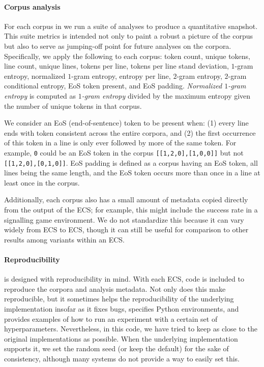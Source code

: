 \paragraph{Corpus analysis}
For each corpus in \theLib{} we run a suite of analyses to produce a quantitative snapshot.
This suite metrics is intended not only to paint a robust a picture of the corpus but also to serve as jumping-off point for future analyses on the corpora.
Specifically, we apply the following to each corpus:
  token count,
  unique tokens,
  line count,
  unique lines,
  tokens per line,
  tokens per line stand deviation,
  $1$-gram entropy,
  normalized $1$-gram entropy,
  entropy per line,
  $2$-gram entropy,
  $2$-gram conditional entropy,
  EoS token present,
  and EoS padding.
\emph{Normalized $1$-gram entropy} is computed as \emph{$1$-gram entropy} divided by the maximum entropy given the number of unique tokens in that corpus.

We consider an EoS (end-of-sentence) token to be present when:
  (1) every line ends with token consistent across the entire corpora,
  and (2) the first occurrence of this token in a line is only ever followed by more of the same token.
For example, \texttt{\small0} could be an EoS token in the corpus \texttt{\small[[1,2,0],[1,0,0]]} but not \texttt{\small[[1,2,0],[0,1,0]]}.
EoS padding is defined as a corpus having an EoS token, all lines being the same length, and the EoS token occurs more than once in a line at least once in the corpus.

Additionally, each corpus also has a small amount of metadata copied directly from the output of the ECS\@; for example, this might include the success rate in a signalling game environment.
We do not standardize this because it can vary widely from ECS to ECS, though it can still be useful for comparison to other results among variants within an ECS\@.

\paragraph{Reproducibility}
\theLib{} is designed with reproducibility in mind.
With each ECS, code is included to reproduce the corpora and analysis metadata.
Not only does this make \theLib{} reproducible, but it sometimes helps the reproducibility of the underlying implementation insofar as it fixes bugs, specifies Python environments, and provides examples of how to run an experiment with a certain set of hyperparameters.
Nevertheless, in this code, we have tried to keep as close to the original implementations as possible.
When the underlying implementation supports it, we set the random seed (or keep the default) for the sake of consistency, although many systems do not provide a way to easily set this.

